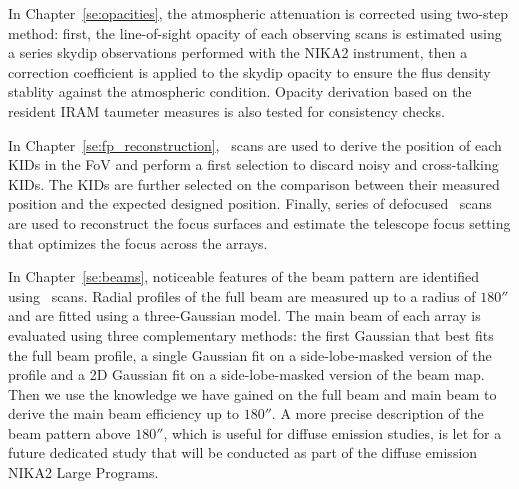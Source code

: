 In Chapter~\ref{se:opacities}, the atmospheric attenuation is corrected
using two-step method: first, the line-of-sight opacity of each
observing scans is estimated using a series skydip observations
performed with the NIKA2 instrument, then a correction coefficient is
applied to the skydip opacity to ensure the flus density stablity
against the atmospheric condition. Opacity derivation based on the
resident IRAM taumeter measures is also tested for consistency checks.

In Chapter~\ref{se:fp_reconstruction}, \bm\ scans are used to derive
the position of each KIDs in the FoV and perform a first selection to
discard noisy and cross-talking KIDs. The KIDs are further selected on
the comparison between their measured position and the expected
designed position. Finally, series of defocused \bm\ scans are used to
reconstruct the focus surfaces and estimate the telescope focus
setting that optimizes the focus across the arrays.   

In Chapter~\ref{se:beams}, noticeable features of the beam pattern are
identified using \bm\ scans. Radial profiles of the full beam are
measured up to a radius of $180''$ and are fitted using a
three-Gaussian model. The main beam of each array is evaluated using
three complementary methods: the first Gaussian that best fits the full
beam profile, a single Gaussian fit on a side-lobe-masked version of
the profile and a 2D Gaussian fit on a side-lobe-masked version of the
beam map. Then we use the knowledge we have gained on the full beam
and main beam to derive the main beam efficiency up to $180''$. A more
precise description of the beam pattern above $180''$, which is useful for
diffuse emission studies, is let for a future dedicated study that
will be conducted as part of the diffuse emission NIKA2 Large
Programs.


